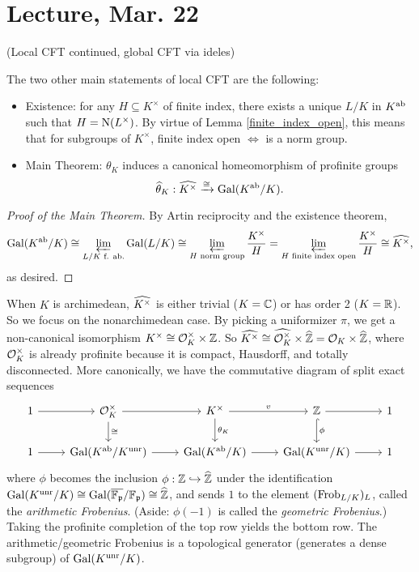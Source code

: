 \documentclass[11pt]{amsart}
\begin{document}
\section{Lecture, Mar. 22}

(Local CFT continued, global CFT via ideles)

The two other main statements of local CFT are the following:

\begin{itemize}
    \item Existence: for any $H\subseteq K^\times$ of finite index, there exists a unique $L/K$ in $K^{\operatorname{ab}}$ such that $H = \operatorname{N}(L^\times)$. By virtue of Lemma \ref{finite_index_open}, this means that for subgroups of $K^\times$, finite index open $\iff$ is a norm group.
    \item Main Theorem: $\theta_K$ induces a canonical homeomorphism of profinite groups
    \[\widehat{\theta}_K: \widehat{K^\times} \xrightarrow{\cong} \operatorname{Gal}(K^{\operatorname{ab}}/K).\]
\end{itemize}

\begin{proof}[Proof of the Main Theorem]
    By Artin reciprocity and the existence theorem,
    \[\operatorname{Gal}(K^{\operatorname{ab}}/K) \cong \varprojlim_{L/K \text{ f. ab.}} \operatorname{Gal}(L/K) \cong \varprojlim_{H \text{ norm group}} \frac{K^\times}{H} = \varprojlim_{H \text{ finite index open}} \frac{K^\times}{H} \cong \widehat{K^\times},\]
    as desired.
\end{proof}

When $K$ is archimedean, $\widehat{K^\times}$ is either trivial ($K = \mathbb{C}$) or has order 2 ($K = \mathbb{R}$). So we focus on the nonarchimedean case. By picking a uniformizer $\pi$, we get a non-canonical isomorphism $K^\times \cong \mathcal{O}_K^\times\times \mathbb{Z}$. So $\widehat{K^\times} \cong \widehat{\mathcal{O}_K^\times}\times \widehat{\mathbb{Z}} = \mathcal{O}_K\times \widehat{\mathbb{Z}}$, where $\mathcal{O}_K^\times$ is already profinite because it is compact, Hausdorff, and totally disconnected. More canonically, we have the commutative diagram of split exact sequences
\[\begin{tikzcd}
	1 & {\mathcal{O}_K^\times} & {K^\times} & \ZZ & 1 \\
	1 & {\Gal(K^{\ab}/K^{\unr})} & {\Gal(K^{\ab}/K)} & {\Gal(K^{\unr}/K)} & 1
	\arrow[from=1-1, to=1-2]
	\arrow[from=1-2, to=1-3]
	\arrow["v", from=1-3, to=1-4]
	\arrow[from=1-4, to=1-5]
	\arrow[from=2-1, to=2-2]
	\arrow[from=2-2, to=2-3]
	\arrow[from=2-3, to=2-4]
	\arrow[from=2-4, to=2-5]
	\arrow["\cong", from=1-2, to=2-2]
	\arrow["{\theta_K}", from=1-3, to=2-3]
	\arrow["\phi", hook, from=1-4, to=2-4]
\end{tikzcd}\]
where $\phi$ becomes the inclusion $\phi: \mathbb{Z}\hookrightarrow \widehat{\mathbb{Z}}$ under the identification $\operatorname{Gal}(K^{\operatorname{unr}}/K)\cong \operatorname{Gal}(\overline{\mathbb{F}_{\mathfrak{p}}}/\mathbb{F}_{\mathfrak{p}}) \cong \widehat{\mathbb{Z}}$, and sends $1$ to the element $(\operatorname{Frob}_{L/K})_L$, called the \emph{arithmetic Frobenius}. (Aside: $\phi(-1)$ is called the \emph{geometric Frobenius}.) Taking the profinite completion of the top row yields the bottom row. The arithmetic/geometric Frobenius is a topological generator (generates a dense subgroup) of $\operatorname{Gal}(K^{\operatorname{unr}}/K)$. 
\end{document}
